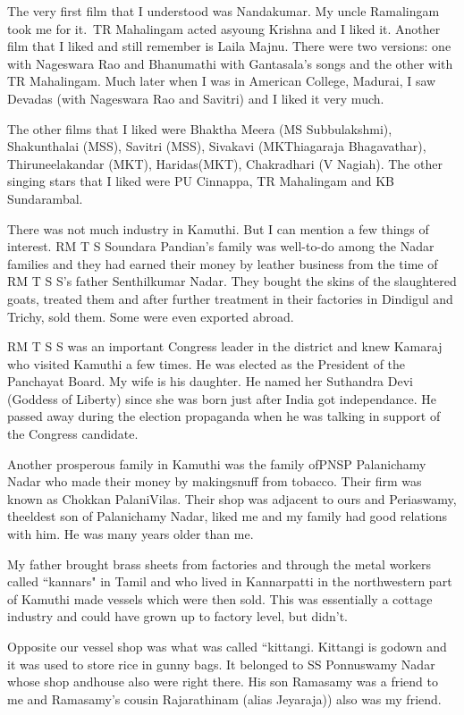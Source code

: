 The very first film that I understood was Nandakumar. My uncle 
Ramalingam took me for it.\ TR Mahalingam acted as\break young Krishna and I 
liked it. Another film that I liked and still remember is Laila Majnu. 
There were two versions: one with Nageswara Rao and Bhanumathi with 
Gantasala's songs and the other with TR Mahalingam. Much later when I 
was in American\- College, Madurai, I saw Devadas (with Nageswara Rao and\break 
Savitri) and I liked it very much.

The other films that I liked were Bhaktha Meera (MS Subbu\-lakshmi), Shakunthalai (MSS), Savitri (MSS), Sivakavi (MK\break Thiagaraja Bhagavathar), Thiruneelakandar (MKT), Haridas\break (MKT), Chakradhari (V Nagiah). The other singing stars that I liked were PU Cinnappa, TR Mahalingam and KB Sunda\-rambal.

There was not much industry in Kamuthi. But I can mention a few things 
of interest. RM T S Soundara Pandian's family was well-to-do among the 
Nadar families and they had earned their money by leather business from 
the time of RM T S S's father Senthilkumar Nadar. They bought the skins 
of the slaughtered goats, treated them and after further treatment in 
their factories in Dindigul and Trichy, sold them. Some were even 
exported abroad.

RM T S S was an important Congress leader in the district and knew 
Kamaraj who visited Kamuthi a few times. He was elected as the President 
of the Panchayat Board. My wife is his daughter. He named her Suthandra 
Devi (Goddess of Liberty) since she was born just after India got 
independance. He passed away during the election propaganda when he was 
talking in support of the Congress candidate.

Another prosperous family in Kamuthi was the family of\break PNSP Palanichamy 
Nadar who made their money by making\break snuff from tobacco. Their firm was 
known as Chokkan Palani\break Vilas. Their shop was adjacent to ours and 
Periaswamy, the\break eldest son of Palanichamy Nadar, liked me and my family 
had good relations with him. He was many years older than me.

My father brought brass sheets from factories and through the metal 
workers called ``kannars" in Tamil and who lived in Kannarpatti in the 
northwestern part of Kamuthi made vessels which were then sold. This was 
essentially a cottage industry and could have grown up to factory level, 
but didn't.

Opposite our vessel shop was what was called ``kittangi. Kittangi 
is godown and it was used to store rice in gunny bags. It belonged to SS 
Ponnuswamy Nadar whose shop and\break house also were right there. His son 
Ramasamy was a friend to me and Ramasamy's cousin Rajarathinam (alias 
Jeyaraja)) also was my friend.

